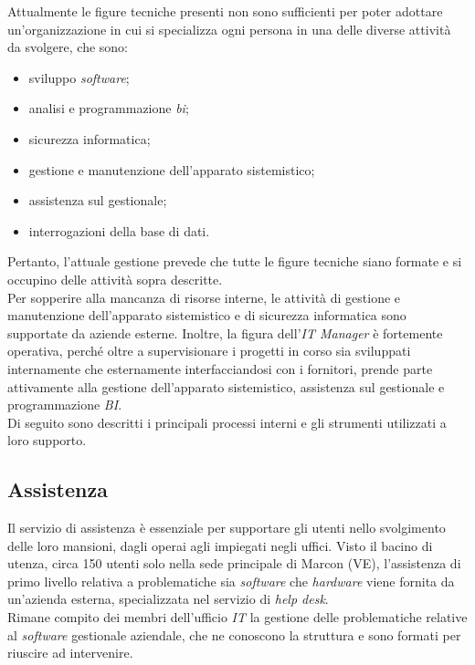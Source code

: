 Attualmente le figure tecniche presenti non sono sufficienti per poter adottare un'organizzazione in cui si specializza ogni persona in una delle diverse attività da svolgere, che sono:
\begin{itemize}
\item sviluppo \textit{software}; 
\item analisi e programmazione \textit{\gls{bi}\glsfirstoccur}; 
\item sicurezza informatica; 
\item gestione e manutenzione dell'apparato sistemistico; 
\item assistenza sul gestionale; 
\item interrogazioni della base di dati.
\end{itemize}
Pertanto, l'attuale gestione prevede che tutte le figure tecniche siano formate e si occupino delle attività sopra descritte.\\
Per sopperire alla mancanza di risorse interne, le attività di gestione e manutenzione dell'apparato sistemistico e di sicurezza informatica sono supportate da aziende esterne. 
Inoltre, la figura dell'\textit{IT Manager} è fortemente operativa, perché oltre a supervisionare i progetti in corso sia sviluppati internamente che esternamente interfacciandosi con i fornitori, prende parte attivamente alla gestione dell'apparato sistemistico, assistenza sul gestionale e programmazione \textit{BI}.\\
Di seguito sono descritti i principali processi interni e gli strumenti utilizzati a loro supporto.


\subsection{Assistenza}

Il servizio di assistenza è essenziale per supportare gli utenti nello svolgimento delle loro mansioni, dagli operai agli impiegati negli uffici. Visto il bacino di utenza, circa 150 utenti solo nella sede principale di Marcon (VE), l'assistenza di primo livello relativa a problematiche sia \textit{software} che \textit{hardware} viene fornita da un'azienda esterna, specializzata nel servizio di \textit{help desk}.\\
Rimane compito dei membri dell'ufficio \textit{IT} la gestione delle problematiche relative al \textit{software} gestionale aziendale, che ne conoscono la struttura e sono formati per riuscire ad intervenire. 

